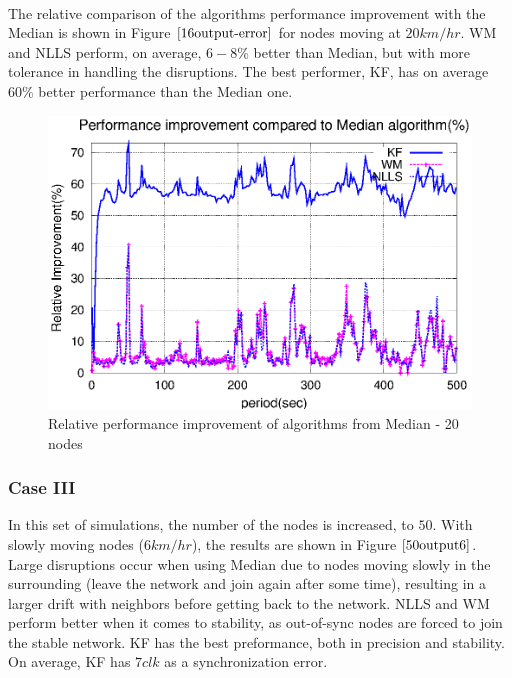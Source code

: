 \documentclass[a4paper,10pt]{report}
\begin{document}
\paragraph*{}
The relative comparison of the algorithms performance improvement with the Median is shown in Figure $\ref{16output-error}$ for nodes moving at $20km/hr$. WM and NLLS perform, on average, $6-8\%$ better than Median, but with more tolerance in handling the disruptions. The best performer, KF, has on average $60\%$ better performance than the Median one.
\begin{figure}
\centering
\includegraphics[width= 0.7 \textwidth]{16output-error}
\caption{Relative performance improvement of algorithms from Median - 20 nodes} \label{16error}
\end{figure}
\subsubsection{\textbf{Case III}}
In this set of simulations, the number of the nodes is increased, to $50$. With slowly moving nodes ($6km/hr$), the results are shown in Figure $\ref{50output6}$. Large disruptions occur when using Median due to nodes moving slowly in the surrounding (leave the network and join again after some time), resulting in a larger drift with neighbors before getting back to the network. NLLS and WM perform better when it comes to stability, as out-of-sync nodes are forced to join the stable network. KF has the best preformance, both in precision and stability. On average, KF has $7clk$ as a synchronization error.
\end{document}
